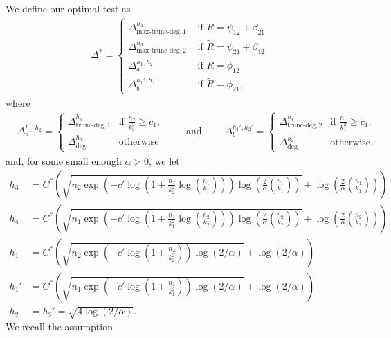 \documentclass{article}
\newcommand{\lin}{\text{deg}}
\newcommand{\chisqlin}{\text{trunc-deg}}
\newcommand{\chisqmax}{\text{max-trunc-deg}}
\begin{document}
We define our optimal test as
\begin{align*}
    \Delta^* = \begin{cases}
        \Delta^{h_3}_{\chisqmax, 1}& \text{ if } \tilde R = \psi_{12} + \beta_{21} \\
        \Delta^{h_3}_{\chisqmax, 2}& \text{ if } \tilde R = \psi_{21} + \beta_{12} \\
        \Delta_a^{h_1,h_2} & \text{ if } \tilde R = \phi_{12}\\
        \Delta_b^{h_1',h_2'} & \text{ if } \tilde R = \phi_{21},
    \end{cases}
\end{align*}
where
\begin{align*}
    &\Delta_a^{h_1,h_2} = \begin{cases}
        \Delta^{h_1}_{\chisqlin, 1} & \text{if  $\frac{n_2}{k_2^2} \geq c_1$,} \\ \Delta^{h_2}_{\lin} & \text{otherwise}
    \end{cases} \qquad \text{ and } 
    \qquad \Delta_b^{h_1',h_2'} = \begin{cases}
        \Delta^{h_1'}_{\chisqlin, 2} & \text{if  $\frac{n_1}{k_1^2} \geq c_1$,} \\ \Delta^{h_2'}_{\lin} & \text{otherwise.}
    \end{cases} 
\end{align*}
and, for some small enough $\alpha>0$, we let 
\begin{align*}
    h_3 &= C^*\left(\sqrt{n_2\exp\left(-c' \log\left(1 + \frac{n_2}{k_2^2}\log{n_1 \choose k_1}\right)\right)\log\left(\frac{2}{\alpha}{n_1 \choose k_1}\right)} + \log\left(\frac{2}{\alpha}{n_1 \choose k_1}\right)\right)\\
    h_4 &= C^*\left(\sqrt{n_1\exp\left(-c' \log\left(1 + \frac{n_1}{k_1^2}\log{n_2 \choose k_2}\right)\right)\log\left(\frac{2}{\alpha}{n_2 \choose k_2}\right)} + \log\left(\frac{2}{\alpha}{n_2 \choose k_2}\right)\right)\\
    h_1 &= C^*\left(\sqrt{n_2\exp\left(-c' \log(1 + \frac{n_2}{k_2^2})\right)\log(2/\alpha)} + \log(2/\alpha)\right)\\
    h_1' &= C^*\left(\sqrt{n_1\exp\left(-c' \log(1 + \frac{n_1}{k_1^2})\right)\log(2/\alpha)} + \log(2/\alpha)\right)\\
    h_2 &= h_2' = \sqrt{4 \log(2/\alpha)}.
\end{align*}
We recall the assumption
\end{document}

